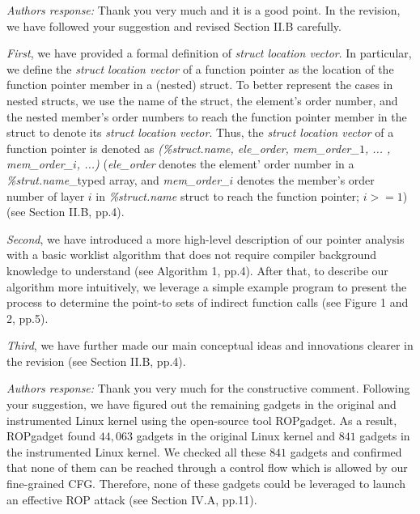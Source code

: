 \documentclass[oneside, 11pt]{article}
\begin{document}
{\em Authors response:}
Thank you very much and it is a good point. In the revision, we have followed
your suggestion and revised Section II.B carefully.

\emph{First}, we have provided a formal definition of \emph{struct location vector}.
In particular, we define the \emph{struct location vector} of a function pointer
as the location of the function pointer member in a (nested) struct.
To better represent the cases in nested structs, we use the name of the
struct, the element's order number, and the nested member's order numbers
to reach the function pointer member in the struct to denote its
\emph{struct location vector}. Thus, the \emph{struct location vector} of a
function pointer is denoted as
\emph{(\%struct.name, ele\_order, mem\_order\_$1$, ... , mem\_order\_$i$, ...)}
(\emph{ele\_order} denotes the element' order number in a \emph{\%strut.name}\_typed
array, and \emph{mem\_order\_$i$} denotes the member's order number of layer
\emph{$i$} in \emph{\%struct.name} struct to reach the function pointer; $i$$>=1$)
(see Section II.B, pp.4).

\emph{Second}, we have introduced a more high-level description of our pointer
analysis with a basic worklist algorithm that does not require compiler
background knowledge to understand (see Algorithm 1, pp.4).
After that, to describe our algorithm more intuitively, we leverage a simple
example program to present the process to determine the point-to sets of
indirect function calls (see Figure 1 and 2, pp.5).

\emph{Third}, we have further made our main conceptual ideas and innovations
clearer in the revision (see Section II.B, pp.4).

\smallskip
\smallskip
\smallskip
{}


{\em Authors response:}
Thank you very much for the constructive comment.
Following your suggestion, we have figured out the remaining gadgets
in the original and instrumented Linux kernel using the open-source tool
ROPgadget. As a result, ROPgadget found $44,063$ gadgets in the original
Linux kernel and $841$ gadgets in the instrumented Linux kernel. We
checked all these $841$ gadgets and confirmed that none of them can be
reached through a control flow which is allowed by our fine-grained CFG.
Therefore, none of these gadgets could be leveraged to launch an effective ROP
attack (see Section IV.A, pp.11).
\end{document}
